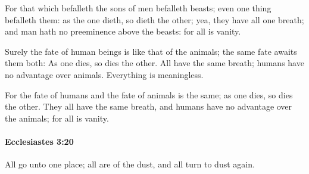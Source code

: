 			\begin{versebox}
					\item[BHS] 
					\item[LXX] 
					\item[ASV] For that which befalleth the sons of men befalleth beasts; even one thing befalleth them: as the one dieth, so dieth the other; yea, they have all one breath; and man hath no preeminence above the beasts: for all is vanity.
					\item[NIV] Surely the fate of human beings is like that of the animals; the same fate awaits them both: As one dies, so dies the other. All have the same breath; humans have no advantage over animals. Everything is meaningless.
					\item[NRSV] For the fate of humans and the fate of animals is the same; as one dies, so dies the other. They all have the same breath, and humans have no advantage over the animals; for all is vanity.
			\end{versebox}

		\paragraph{Ecclesiastes 3:20} %
			\label{ECCLESIASTES-3-20}

			All go unto one place; all are of the dust, and all turn to dust again.

